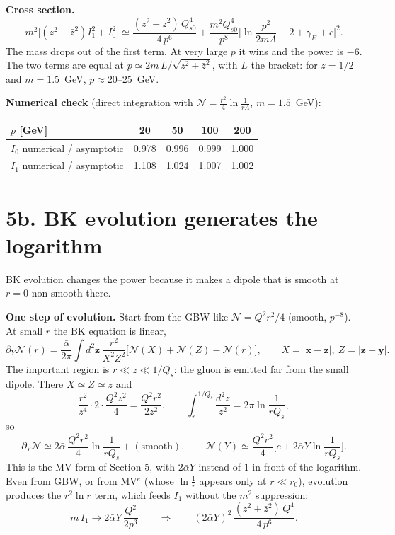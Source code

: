 \documentclass[12pt]{article}
\begin{document}
\textbf{Cross section.}
\[
  m^2\Big[(z^2+\bar z^2)I_1^2+I_0^2\Big]\simeq
  \frac{(z^2+\bar z^2)\,Q_{s0}^4}{4\,p^6}
  +\frac{m^2Q_{s0}^4}{p^8}\Big[\ln\frac{p^2}{2m\Lambda}-2+\gamma_E+c\Big]^2 .
\]
The mass drops out of the first term. At very large $p$ it wins and the power is $-6$. The two
terms are equal at $p\simeq2m\,L/\sqrt{z^2+\bar z^2}$, with $L$ the bracket: for $z=1/2$ and $m=1.5$~GeV,
$p\approx20$--$25$~GeV.

\textbf{Numerical check} (direct integration with $\mathcal N=\frac{r^2}{4}\ln\frac1{r\Lambda}$, $m=1.5$~GeV):
\begin{center}
\begin{tabular}{lcccc}
\toprule
$p$ [GeV] & 20 & 50 & 100 & 200 \\
\midrule
$I_0$ numerical / asymptotic & 0.978 & 0.996 & 0.999 & 1.000 \\
$I_1$ numerical / asymptotic & 1.108 & 1.024 & 1.007 & 1.002 \\
\bottomrule
\end{tabular}
\end{center}

\section*{5b. BK evolution generates the logarithm}

BK evolution changes the power because it makes a dipole that is smooth at $r=0$ non-smooth there.

\textbf{One step of evolution.} Start from the GBW-like $\mathcal N=Q^2r^2/4$ (smooth, $p^{-8}$). At small
$r$ the BK equation is linear,
\[
  \partial_Y\mathcal N(r)=\frac{\bar\alpha}{2\pi}\int d^2\mathbf z\,\frac{r^2}{X^2Z^2}
  \big[\mathcal N(X)+\mathcal N(Z)-\mathcal N(r)\big],\qquad X=|\mathbf x-\mathbf z|,\ Z=|\mathbf z-\mathbf y|.
\]
The important region is $r\ll z\ll1/Q_s$: the gluon is emitted far from the small dipole. There
$X\simeq Z\simeq z$ and
\[
  \frac{r^2}{z^4}\cdot2\cdot\frac{Q^2z^2}{4}=\frac{Q^2r^2}{2z^2},\qquad
  \int_r^{1/Q_s}\frac{d^2z}{z^2}=2\pi\ln\frac1{rQ_s},
\]
so
\[
  \partial_Y\mathcal N\simeq2\bar\alpha\,\frac{Q^2r^2}{4}\ln\frac1{rQ_s}+(\text{smooth}),\qquad
  \mathcal N(Y)\simeq\frac{Q^2r^2}{4}\Big[c+2\bar\alpha Y\ln\frac1{rQ_s}\Big].
\]
This is the MV form of Section 5, with $2\bar\alpha Y$ instead of $1$ in front of the logarithm. Even
from GBW, or from MV$^e$ (whose $\ln\frac1r$ appears only at $r\ll r_0$), evolution produces the $r^2\ln r$ term, which feeds
$I_1$ without the $m^2$ suppression:
\[
  m\,I_1\to2\bar\alpha Y\,\frac{Q^2}{2p^3}\qquad\Longrightarrow\qquad
  (2\bar\alpha Y)^2\,\frac{(z^2+\bar z^2)\,Q^4}{4\,p^6}.
\]
\end{document}
